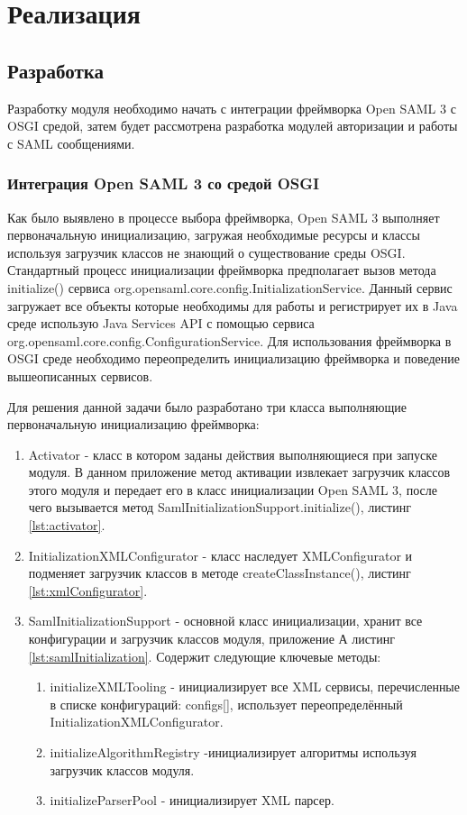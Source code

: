 \chapter{Реализация}
\label{cha:impl}

\section{Разработка}
Разработку модуля необходимо начать с интеграции фреймворка Open SAML 3 с OSGI средой, затем будет рассмотрена разработка модулей авторизации и работы с SAML сообщениями.

\subsection{Интеграция Open SAML 3 со средой OSGI}
Как было выявлено в процессе выбора фреймворка, Open SAML 3 выполняет первоначальную инициализацию, загружая необходимые ресурсы и классы используя загрузчик классов не знающий о существование среды OSGI. Стандартный процесс инициализации фреймворка предполагает вызов метода initialize() сервиса org.opensaml.core.config.InitializationService. Данный сервис загружает все объекты которые необходимы для работы и регистрирует их в Java среде использую Java Services API с помощью сервиса org.opensaml.core.config.ConfigurationService. Для использования фреймворка в OSGI среде необходимо переопределить инициализацию фреймворка и поведение вышеописанных сервисов.

Для решения данной задачи было разработано три класса выполняющие первоначальную инициализацию фреймворка:
\begin{enumerate}
\item Activator - класс в котором заданы действия выполняющиеся при запуске модуля. В данном приложение метод активации извлекает загрузчик классов этого модуля и передает его в класс инициализации Open SAML 3, после чего вызывается метод SamlInitializationSupport.initialize(), листинг \ref{lst:activator}.
\item InitializationXMLConfigurator - класс наследует XMLConfigurator и подменяет загрузчик классов в методе createClassInstance(), листинг \ref{lst:xmlConfigurator}.
\item SamlInitializationSupport - основной класс инициализации, хранит все конфигурации и загрузчик классов модуля, приложение А листинг \ref{lst:samlInitialization}. Содержит следующие ключевые методы:
\begin{enumerate}
\item initializeXMLTooling - инициализирует все XML сервисы, перечисленные в списке конфигураций: configs[], использует переопределённый InitializationXMLConfigurator.
\item initializeAlgorithmRegistry -инициализирует алгоритмы используя загрузчик классов модуля.
\item initializeParserPool - инициализирует XML парсер.
\end{enumerate}
\end{enumerate}

